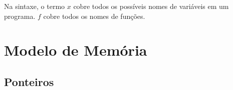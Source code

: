 \noindent Na sintaxe, o termo $x$ cobre todos os possíveis nomes de variáveis em um programa. 
$f$ cobre todos os nomes de funções.



\section{Modelo de Memória}



\subsection{Ponteiros}


